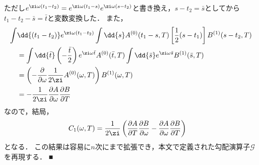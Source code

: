 \documentclass[a4paper,10pt]{jsarticle}
\begin{document}
ただし$e^{\zi \omega (t_1 - t_2)} = e^{\zi \omega (t_1 - s)} e^{\zi \omega (s - t_2)}$と書き換え，$s - t_2 = \bar{s}$としてから$t_1 - t_2 - \bar{s} = \bar{t}$と変数変換した．
また，
\begin{align*}
\int & \dd{(t_1 - t_2)} e^{\zi \omega (t_1 - t_2)}
		\int \dd{s} A^{(0)} (t_1 - s, T) \left[ \frac{1}{2} (s - t_1) \right] B^{(1)} (s - t_2, T)
\\	& = \int \dd{\bar{t}} \left( - \frac{\bar{t}}{2} \right) e^{\zi \omega \bar{t}} A^{(0)} (\bar{t}, T) \int \dd{\bar{s}} e^{\zi \omega \bar{s}} B^{(1)} (\bar{s}, T)
\\
	& = \left( - \frac{\partial}{\partial \omega} \frac{1}{2 \zi} A^{(0)} (\omega, T) \right) B^{(1)} (\omega, T)
\\
	& = - \frac{1}{2 \zi} \frac{\partial A}{\partial \omega} \frac{\partial B}{\partial T}
\end{align*}
なので，結局，
\begin{align}
C_1 (\omega, T)
	& = \frac{1}{2 \zi} \left(
		\frac{\partial A}{\partial T} \frac{\partial B}{\partial \omega}
		- \frac{\partial A}{\partial \omega} \frac{\partial B}{\partial T}
	\right)
\end{align}
となる．
この結果は容易に$n$次にまで拡張でき，本文で定義された勾配演算子$\mathcal{G}$を再現する．
■




%
\end{document}
